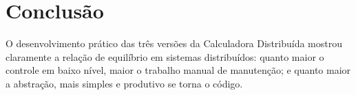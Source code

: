\documentclass[12pt, a4paper]{article}
\begin{document}




\section{Conclusão}

O desenvolvimento prático das três versões da Calculadora Distribuída mostrou claramente a relação de equilíbrio em sistemas distribuídos: quanto maior o controle em baixo nível, maior o trabalho manual de manutenção; e quanto maior a abstração, mais simples e produtivo se torna o código.
\end{document}

